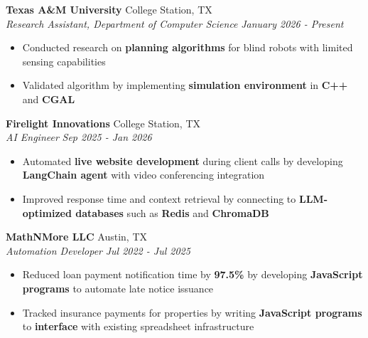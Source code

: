 \documentclass[9pt]{article}
\begin{document}
\noindent\textbf{Texas A\&M University} \hfill College Station, TX \\
\textit{Research Assistant, Department of Computer Science} \hfill \textit{January 2026 - Present}
\begin{itemize}
    \item Conducted research on \textbf{planning algorithms} for blind robots with limited sensing capabilities
    \item Validated algorithm by implementing \textbf{simulation environment} in \textbf{C++} and \textbf{CGAL}
\end{itemize}

\noindent\textbf{Firelight Innovations} \hfill College Station, TX \\
\textit{AI Engineer} \hfill \textit{Sep 2025 - Jan 2026}
\begin{itemize}
    \item Automated \textbf{live website development} during client calls by developing \textbf{LangChain agent} with video conferencing integration
    \item Improved response time and context retrieval by connecting to \textbf{LLM-optimized databases} such as \textbf{Redis} and \textbf{ChromaDB}
\end{itemize}

\noindent\textbf{MathNMore LLC} \hfill Austin, TX \\
\textit{Automation Developer} \hfill \textit{Jul 2022 - Jul 2025}
\begin{itemize}
    \item Reduced loan payment notification time by \textbf{97.5\%} by developing \textbf{JavaScript programs} to automate late notice issuance
    \item Tracked insurance payments for properties by writing \textbf{JavaScript programs} to \textbf{interface} with existing spreadsheet infrastructure
\end{itemize}
\end{document}
